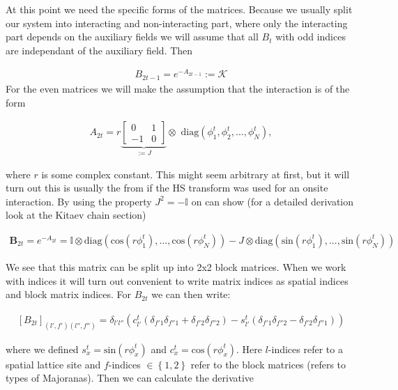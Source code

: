 \documentclass{article}
\begin{document}
At this point we need the specific forms of the matrices. Because we usually split our system into interacting and non-interacting part, where only the interacting part depends on the auxiliary fields we will assume that all $B_t$ with odd indices are independant of the auxiliary field. Then

\begin{align}
	B_{2t-1} = e^{-A_{2t-1}} := \mathcal{K}
\end{align}
For the even matrices we will make the assumption that the interaction is of the form

\begin{align}
	A_{2t} = r \underbrace{\begin{bmatrix}
			0 & 1 \\
			-1 & 0
	\end{bmatrix}}_{:=J}  \otimes\,\, \mathrm{diag}\left(\phi_{1}^{t}, \phi_{2}^{t},...,\phi_{N}^{t}\right)   ,
\end{align}

where $r$ is some complex constant. This might seem arbitrary at first, but it will turn out this is usually the from if the HS transform was used for an onsite interaction. By using the property $J^{2} = -\mathbb{I}$ on can show (for a detailed derivation look at the Kitaev chain section)

\begin{align}
	\boldsymbol{B}_{2t} = e^{-A_{2t}} = \mathbb{I} \otimes \mathrm{diag}\left(\mathrm{cos}\left(r\phi_{1}^{t} \right),...,\mathrm{cos}\left(r\phi_{N}^{t} \right)      \right) 
	- J \otimes \mathrm{diag}\left(\mathrm{sin}\left(r\phi_{1}^{t} \right),...,\mathrm{sin}\left(r\phi_{N}^{t} \right)      \right)     
\end{align} 





We see that this matrix can be split up into 2x2 block matrices. When we work with indices it will turn out convenient to write matrix indices as spatial indices and block matrix indices. For $B_{2t}$ we can then write:

\begin{align}
	\left[ B_{2t}  \right]_{(l',f')(l'',f'')} = \delta_{l'l''}\left(c^{t}_{l'}\left(\delta_{f'1}\delta_{f''1} + \delta_{f'2}\delta_{f''2}  \right) - s^{t}_{l'}\left(\delta_{f'1}\delta_{f''2} - \delta_{f'2}\delta_{f''1}  \right)   \right)   
\end{align}

where we defined $s^{t}_{x}= \mathrm{sin} \left(r \phi^{t}_{x} \right) $ and $c^{t}_{x}= \mathrm{cos} \left(r \phi^{t}_{x} \right)$. Here $l$-indices refer to a spatial lattice site and $f$-indices $\in \left\{1,2\right\} $ refer to the block matrices (refers to types of Majoranas). Then we can calculate the derivative
\end{document}
